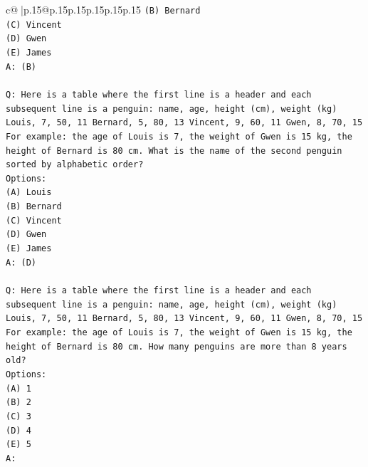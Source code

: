 \documentclass{article}
\begin{document}
{\begin{supertabular}{c@{$\;$}|p{.15\linewidth}@{}p{.15\linewidth}p{.15\linewidth}p{.15\linewidth}p{.15\linewidth}p{.15\linewidth}}
{{{\texttt{(B) Bernard} \\
\texttt{(C) Vincent} \\
\texttt{(D) Gwen} \\
\texttt{(E) James} \\
\texttt{A: (B)} \\
\\ 
\texttt{Q: Here is a table where the first line is a header and each subsequent line is a penguin:  name, age, height (cm), weight (kg) Louis, 7, 50, 11 Bernard, 5, 80, 13 Vincent, 9, 60, 11 Gwen, 8, 70, 15  For example: the age of Louis is 7, the weight of Gwen is 15 kg, the height of Bernard is 80 cm.  What is the name of the second penguin sorted by alphabetic order?} \\
\texttt{Options:} \\
\texttt{(A) Louis} \\
\texttt{(B) Bernard} \\
\texttt{(C) Vincent} \\
\texttt{(D) Gwen} \\
\texttt{(E) James} \\
\texttt{A: (D)} \\
\\ 
\texttt{Q: Here is a table where the first line is a header and each subsequent line is a penguin:  name, age, height (cm), weight (kg) Louis, 7, 50, 11 Bernard, 5, 80, 13 Vincent, 9, 60, 11 Gwen, 8, 70, 15  For example: the age of Louis is 7, the weight of Gwen is 15 kg, the height of Bernard is 80 cm.  How many penguins are more than 8 years old?} \\
\texttt{Options:} \\
\texttt{(A) 1} \\
\texttt{(B) 2} \\
\texttt{(C) 3} \\
\texttt{(D) 4} \\
\texttt{(E) 5} \\
\texttt{A:} \\
            }
        }
    }
     \\ \\


\end{supertabular}}
\end{document}
